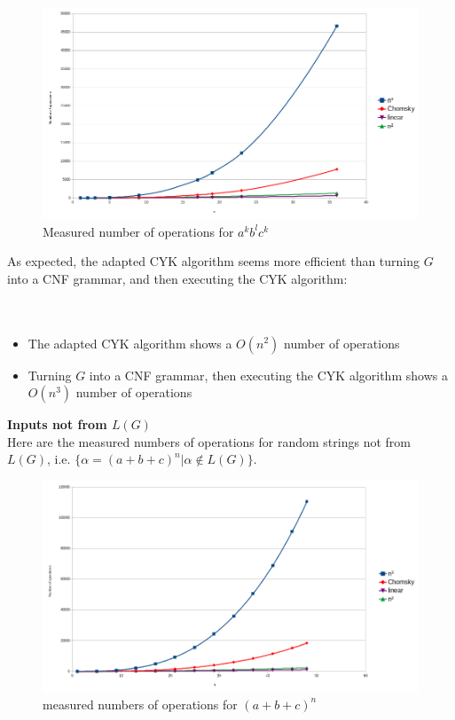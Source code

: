 \documentclass[12pt]{extarticle}
\begin{document}
\begin{figure}[h]
  \label{fig:plr}
  \includegraphics[width=\textwidth]{linear/complexity_as_bs_cs}
  \caption{Measured number of operations for $a^kb^lc^k$}
\end{figure}

\begin{multicols}{2}
As expected, the adapted CYK algorithm seems more efficient than turning $G$ into a
CNF grammar, and then executing the CYK algorithm:
\\\\\\
\begin{itemize}
\item The adapted CYK algorithm shows a $O(n^2)$ number of operations
\item Turning $G$ into a CNF grammar, then executing the CYK algorithm shows a
  $O(n^3)$ number of operations
\end{itemize}

\end{multicols}
\newpage
\textbf{Inputs not from $L(G)$}\\
Here are the measured numbers of operations for random strings not from $L(G)$, i.e. $\{\alpha=(a+b+c)^n|\alpha\notin L(G)\}$.\\

\begin{figure}[h]
  \label{fig:plr}
  \includegraphics[width=\textwidth]{linear/complexity_random_abc}
  \caption{measured numbers of operations for $(a+b+c)^n$}
\end{figure}
\end{document}

